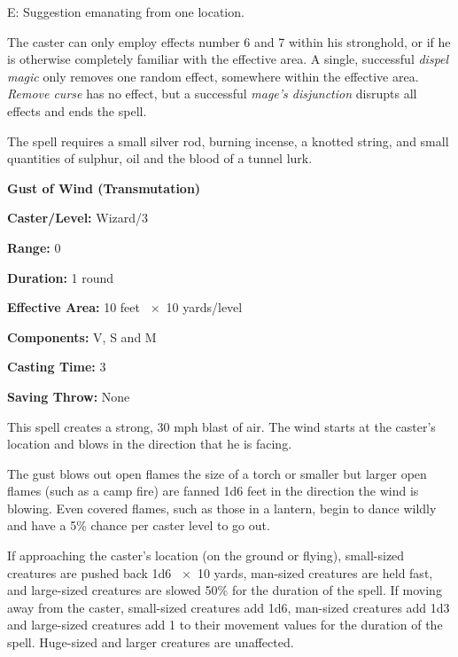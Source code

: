 \begin{multicols}{2}
\hspace{1em}E: Suggestion emanating from one location.

The caster can only employ effects number 6 and 7 within his stronghold, or if he is otherwise completely familiar with the effective area.  A single, successful \textit{dispel magic} only removes one random effect, somewhere within the effective area.  \textit{Remove curse} has no effect, but a successful \textit{mage's disjunction} disrupts all effects and ends the spell.

The spell requires a small silver rod, burning incense, a knotted string, and small quantities of sulphur, oil and the blood of a tunnel lurk.

\vspace{1em}

\noindent
\begin{minipage}{\columnwidth}

\noindent \textbf{Gust of Wind (Transmutation)}

\noindent \textbf{Caster/Level:} Wizard/3

\noindent \textbf{Range:} 0

\noindent \textbf{Duration:} 1 round

\noindent \textbf{Effective Area:} 10 feet ~$\times$~10 yards/level

\noindent \textbf{Components:} V, S and M

\noindent \textbf{Casting Time:} 3

\noindent \textbf{Saving Throw:} None

\end{minipage}

This spell creates a strong, 30 mph blast of air.  The wind starts at the caster's location and blows in the direction that he is facing.  

The gust blows out open flames the size of a torch or smaller but larger open flames (such as a camp fire) are fanned 1d6 feet in the direction the wind is blowing.  Even covered flames, such as those in a lantern, begin to dance wildly and have a 5\% chance per caster level to go out.

If approaching the caster's location (on the ground or flying), small-sized creatures are pushed back 1d6 ~$\times$~10 yards, man-sized creatures are held fast, and large-sized creatures are slowed 50\% for the duration of the spell.  If moving away from the caster, small-sized creatures add 1d6, man-sized creatures add 1d3 and large-sized creatures add 1 to their movement values for the duration of the spell.  Huge-sized and larger creatures are unaffected.


\end{multicols}
